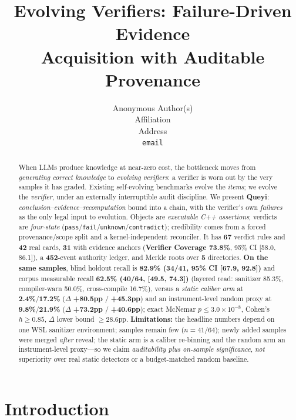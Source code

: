 \documentclass{article}
\title{Evolving Verifiers: Failure-Driven Evidence\\ Acquisition with Auditable Provenance}
\author{%
  Anonymous Author(s) \\
  Affiliation \\
  Address \\
  \texttt{email} \\
}
\begin{document}
\maketitle

\begin{abstract}
When LLMs produce knowledge at near-zero cost, the bottleneck moves from \emph{generating correct
knowledge} to \emph{evolving verifiers}: a verifier is worn out by the very samples it has
graded. Existing self-evolving benchmarks evolve the \emph{items}; we evolve the \emph{verifier},
under an externally interruptible audit discipline. We present \textbf{Queyi}:
\emph{conclusion--evidence--recomputation} bound into a chain, with the verifier's own
\emph{failures} as the only legal input to evolution. Objects are \emph{executable C++
assertions}; verdicts are \emph{four-state}
(\texttt{pass}/\texttt{fail}/\texttt{unknown}/\texttt{contradict}); credibility comes from a
forced provenance/scope split and a kernel-independent reconciler. It has \textbf{67} verdict
rules and \textbf{42} real cards, \textbf{31} with evidence anchors (\textbf{Verifier Coverage
73.8\%}, 95\% CI [58.0, 86.1]), a \textbf{452}-event authority ledger, and Merkle roots over
\textbf{5} directories. \textbf{On the same samples}, blind holdout recall is \textbf{82.9\% (34/41, 95\% CI [67.9,
92.8])} and corpus measurable recall \textbf{62.5\% (40/64, [49.5, 74.3])} (layered read:
sanitizer 85.3\%, compiler-warn 50.0\%, cross-compile 16.7\%), versus a \emph{static caliber arm}
at \textbf{2.4\%}/\textbf{17.2\%} ($\Delta$ \textbf{+80.5pp} / \textbf{+45.3pp}) and an
instrument-level random proxy at \textbf{9.8\%}/\textbf{21.9\%} ($\Delta$ \textbf{+73.2pp} /
\textbf{+40.6pp}); exact McNemar $p\le3.0\times10^{-8}$, Cohen's $h\ge0.85$, $\Delta$ lower
bound $\ge$28.6pp. \textbf{Limitations:} the headline numbers depend on one WSL sanitizer
environment; samples remain few ($n{=}41/64$); newly added samples were merged \emph{after}
reveal; the static arm is a caliber re-binning and the random arm an instrument-level
proxy---so we claim \emph{auditability plus on-sample significance}, \emph{not} superiority over
real static detectors or a budget-matched random baseline.
\end{abstract}

\section{Introduction}
\label{sec:intro}
\end{document}
